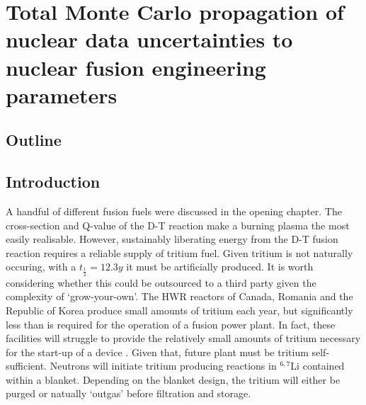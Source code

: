 
\chapter{Total Monte Carlo propagation of nuclear data uncertainties to nuclear fusion engineering parameters} %

\ifpdf
    \graphicspath{{Chapter1/Figs/Raster/}{Chapter1/Figs/PDF/}{Chapter1/Figs/}}
\else
    \graphicspath{{Chapter1/Figs/Vector/}{Chapter1/Figs/}}
\fi


\section{Outline}


\section{Introduction}

\label{introduction}
A handful of different fusion fuels were discussed in the opening chapter. The cross-section and Q-value of the D-T reaction make a burning plasma the most easily realisable. However, sustainably liberating energy from the D-T fusion reaction requires a reliable supply of tritium fuel. Given tritium is not naturally occuring, with a $t_{\frac{1}{2}}=12.3y$  it must be artificially produced. It is worth considering whether this could be outsourced to a third party given the complexity of `grow-your-own'. The HWR reactors of Canada, Romania and the Republic of Korea produce small amounts of tritium each year, but significantly less than is required for the operation of a fusion power plant. In fact, these facilities will struggle to provide the relatively small amounts of tritium necessary for the start-up of a device \cite{Kovari2018}. Given that, future plant must be tritium self-sufficient. Neutrons will initiate tritium producing reactions in $^{6,7}$Li contained within a blanket. Depending on the blanket design, the tritium will either be purged or natually `outgas' before filtration and storage. 


